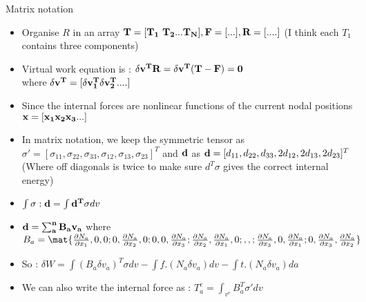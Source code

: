  	\begin{frame}{Matrix notation}
 		\begin{itemize}
 			\item Organise $R$ in an array $\mathbf{T=[T_1~T_2...T_N],F = [...] ,R = [....]}$ (I think each $T_1$ contains three components)
 			\item Virtual work equation is : $ \mathbf{\delta v^TR = \delta v^T(T-F) = 0}$\\
 			where $\mathbf{\delta v^T = [\delta v_1^T \delta v_2^T....]}$
 			\item Since the internal forces are nonlinear functions of the current nodal positions $\mathbf{x = [x_1 x_2 x_3 ...]}$
 			\item In matrix notation, we keep the symmetric tensor as $\sigma' = [ \sigma_{11},\sigma_{22},\sigma_{33},\sigma_{12},\sigma_{13},\sigma_{23}]^T$ and $\mathbf{d}$ as $\mathbf{d} = [ d_{11},d_{22},d_{33},2d_{12},2d_{13},2d_{23}]^T$ (Where off diagonals is twice to make sure $d^T \sigma$ gives the correct internal energy)
 			\item $\mathbf{\int \sigma:d = \int d^T\sigma }dv$
 			\item $\mathbf{d = \sum_{a}^{n}B_av_a}$ where $B_a = \mat{\frac{\partial N_a}{\partial x_1},0,0; 0,\frac{\partial N_a}{\partial x_2},0;0,0,\frac{\partial N_a}{\partial x_3};
 				\frac{\partial N_a}{\partial x_2},\frac{\partial N_a}{\partial x_1},0; , , ;
 				\frac{\partial N_a}{\partial x_3},0,\frac{\partial N_a}{\partial x_1};
 				0,\frac{\partial N_a}{\partial x_3},\frac{\partial N_a}{\partial x_2}}$

 		\end{itemize}
 	\end{frame}
 
 	\begin{frame}
 		\begin{itemize}
 			\item So : $\delta W = \int (B_a \delta v_a)^T \sigma dv - \int f.(N_a \delta v_a) dv - \int t.(N_a \delta v_a) da$ 
 			\item We can also write the internal force as : $T_a^e = \int_{v^e} B^T_a \sigma' dv$
 			
 		\end{itemize} 
 	\end{frame}
 
